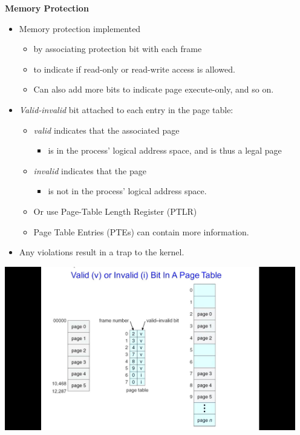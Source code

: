 \documentclass[11pt,a4paper]{article}
\begin{document}
\textbf{Memory Protection}
\begin{itemize}
    \item Memory protection implemented
        \begin{itemize}
            \item by associating protection bit with each frame
            \item to indicate if read-only or read-write access is allowed.
            \item Can also add more bits to indicate page execute-only, and so on.
        \end{itemize}
    \item \emph{Valid-invalid} bit attached to each entry in the page table:
        \begin{itemize}
            \item \emph{valid} indicates that the associated page
                \begin{itemize}
                    \item is in the process' logical address space, and is thus a legal page
                \end{itemize}
            \item \emph{invalid} indicates that the page
                \begin{itemize}
                    \item is not in the process' logical address space.
                \end{itemize}
            \item Or use Page-Table Length Register (PTLR)
            \item Page Table Entries (PTEs) can contain more information.
        \end{itemize}
    \item Any violations result in a trap to the kernel.
\end{itemize}

\includegraphics[height=270]{valid-or-invalid-bit-in-a-page-table.jpg}
\end{document}
